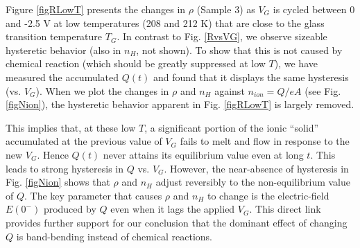 Figure \ref{figRLowT} presents the changes in $\rho$ (Sample 3) as  $V_G$ is cycled between 0 and -2.5 V at 
low temperatures (208 and 212 K) that are close to the glass transition temperature $T_G$. In contrast to Fig. \ref{RvsVG}, we observe
sizeable hysteretic behavior (also in $n_H$, not shown). To show that this is not caused by
chemical reaction (which should be greatly suppressed at low $T$), we have measured the accumulated
$Q(t)$ and found that it displays the same hysteresis (vs. $V_G$). When we plot the changes
in $\rho$ and $n_H$ against $n_{ion} = Q/eA$ (see Fig. \ref{figNion}), 
the hysteretic behavior apparent in Fig. \ref{figRLowT} is largely removed.

This implies that, at these low $T$, a significant portion of the ionic ``solid'' accumulated at the
previous value of $V_G$ fails to melt and flow in response to the new $V_G$. Hence
$Q(t)$ never attains its equilibrium value even at long $t$. This leads 
to strong hysteresis in $Q$ vs. $V_G$. However,
the near-absence of hysteresis in Fig. \ref{figNion} shows that $\rho$ and $n_H$ adjust reversibly to
the non-equilibrium value of $Q$. The key parameter that
causes $\rho$ and $n_H$ to change is the electric-field $E(0^-)$ produced by $Q$ even when it lags
the applied $V_G$. This direct link provides further support for our conclusion that
the dominant effect of changing $Q$ is band-bending instead of chemical reactions.




